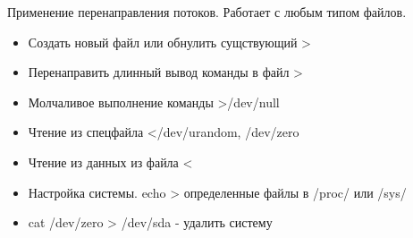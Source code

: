 \begin{frame}{Применение перенаправления потоков.}
Работает с любым типом файлов.
\begin{itemize}
  \item Создать новый файл или обнулить сущствующий >
  \item Перенаправить длинный вывод команды в файл >
  \item Молчаливое выполнение команды >/dev/null 
  \item Чтение из спецфайла </dev/urandom, /dev/zero 
  \item Чтение из данных из файла <
  \item Настройка системы. echo >  определенные файлы в /proc/ или /sys/
  \item cat /dev/zero > /dev/sda - удалить систему
\end{itemize}

\end{frame}

